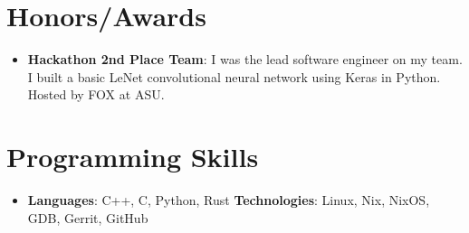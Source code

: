 \documentclass[letterpaper,11pt]{article}
\newcommand{\resumeItem}[2]{
  \item\small{
    \textbf{#1}{: #2 \vspace{-2pt}}
  }
}
\newcommand{\resumeSubItem}[2]{\resumeItem{#1}{#2}\vspace{-4pt}}
\newcommand{\resumeSubHeadingListStart}{\begin{itemize}[leftmargin=*]}
\newcommand{\resumeSubHeadingListEnd}{\end{itemize}}
\begin{document}
\section{Honors/Awards}
  \resumeSubHeadingListStart
    \resumeSubItem{Hackathon 2nd Place Team}
      {I was the lead software engineer on my team. I built a basic LeNet convolutional neural network using Keras in Python. Hosted by FOX at ASU.}
  \resumeSubHeadingListEnd


\section{Programming Skills}
 \resumeSubHeadingListStart
   \item{
     \textbf{Languages}{: C++, C, Python, Rust}
     \hfill
     \textbf{Technologies}{: Linux, Nix, NixOS, GDB, Gerrit, GitHub}
   }
 \resumeSubHeadingListEnd


\end{document}
